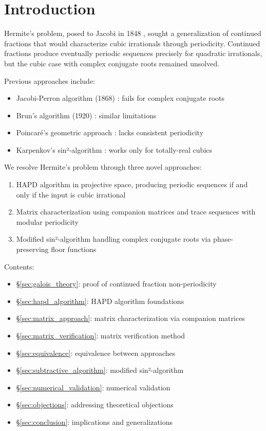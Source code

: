 \section{Introduction}\label{sec:intro}

Hermite's problem, posed to Jacobi in 1848 \cite{Hermite1848}, sought a generalization of continued fractions that would characterize cubic irrationals through periodicity. Continued fractions produce eventually periodic sequences precisely for quadratic irrationals, but the cubic case with complex conjugate roots remained unsolved.

Previous approaches include:
\begin{itemize}
\item Jacobi-Perron algorithm (1868) \cite{Jacobi1868}: fails for complex conjugate roots
\item Brun's algorithm (1920) \cite{Brentjes1981}: similar limitations
\item Poincaré's geometric approach \cite{KarpenkovBook}: lacks consistent periodicity
\item Karpenkov's sin²-algorithm \cite{Karpenkov2019}: works only for totally-real cubics
\end{itemize}

We resolve Hermite's problem through three novel approaches:
\begin{enumerate}
\item HAPD algorithm in projective space, producing periodic sequences if and only if the input is cubic irrational
\item Matrix characterization using companion matrices and trace sequences with modular periodicity
\item Modified sin²-algorithm handling complex conjugate roots via phase-preserving floor functions
\end{enumerate}

Contents:
\begin{itemize}
\item \S\ref{sec:galois_theory}: proof of continued fraction non-periodicity
\item \S\ref{sec:hapd_algorithm}: HAPD algorithm foundations
\item \S\ref{sec:matrix_approach}: matrix characterization via companion matrices
\item \S\ref{sec:matrix_verification}: matrix verification method
\item \S\ref{sec:equivalence}: equivalence between approaches
\item \S\ref{sec:subtractive_algorithm}: modified sin²-algorithm
\item \S\ref{sec:numerical_validation}: numerical validation
\item \S\ref{sec:objections}: addressing theoretical objections
\item \S\ref{sec:conclusion}: implications and generalizations
\end{itemize}

